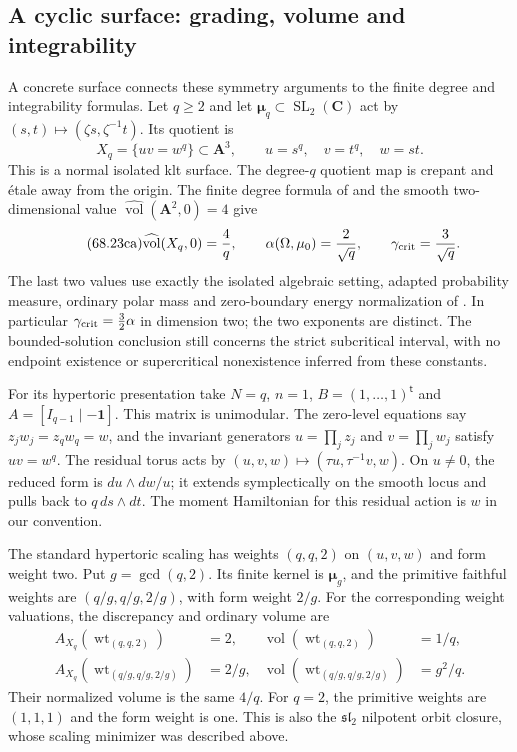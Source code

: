 \subsection{A cyclic surface: grading, volume and integrability}
\label{sec:ytd-local-cyclic-symplectic-example}

A concrete surface connects these symmetry arguments to the finite
degree and integrability formulas. Let $q\geq2$ and let
$\boldsymbol\mu_q\subset\operatorname{SL}_2(\mathbf C)$ act by
$(s,t)\mapsto(\zeta s,\zeta^{-1}t)$. Its quotient is
\[
\tag{68.23bz}\label{eq:ytd-cyclic-surface}
 X_q=\{uv=w^q\}\subset\mathbf A^3,
 \qquad u=s^q,\quad v=t^q,\quad w=st.
\]
This is a normal isolated klt surface. The degree-$q$ quotient map
is crepant and \'etale away from the origin. The finite degree
formula of  and the smooth
two-dimensional value $\widehat{\operatorname{vol}}(\mathbf A^2,0)=4$
give
\[
\tag{68.23ca}\label{eq:ytd-cyclic-volume-thresholds}
 \widehat{\operatorname{vol}}(X_q,0)=\frac4q,
 \qquad \alpha(\Omega,\mu_0)=\frac2{\sqrt q},
 \qquad \gamma_{\rm crit}=\frac3{\sqrt q}.
\]
The last two values use exactly the isolated algebraic setting,
adapted probability measure, ordinary polar mass and zero-boundary
energy normalization of .
In particular $\gamma_{\rm crit}=\frac32\alpha$ in dimension two;
the two exponents are distinct. The bounded-solution conclusion
still concerns the strict subcritical interval, with no endpoint
existence or supercritical nonexistence inferred from these constants.

For its hypertoric presentation take $N=q$, $n=1$,
$B=(1,\ldots,1)^{\mathsf t}$ and
$A=[I_{q-1}\mid-\mathbf 1]$. This matrix is unimodular.
The zero-level equations say $z_jw_j=z_qw_q=w$, and the
invariant generators $u=\prod_j z_j$ and $v=\prod_j w_j$
satisfy $uv=w^q$. The residual torus acts by
$(u,v,w)\mapsto(\tau u,\tau^{-1}v,w)$. On $u\ne0$, the reduced
form is $du\wedge dw/u$; it extends symplectically on the smooth
locus and pulls back to $q\,ds\wedge dt$. The moment Hamiltonian
for this residual action is $w$ in our convention.

The standard hypertoric scaling has weights $(q,q,2)$ on $(u,v,w)$
and form weight two. Put $g=\gcd(q,2)$. Its finite kernel is
$\boldsymbol\mu_g$, and the primitive faithful weights are
$(q/g,q/g,2/g)$, with form weight $2/g$. For the corresponding
weight valuations, the discrepancy and ordinary volume are
\[
\tag{68.23cb}\label{eq:ytd-cyclic-primitive-weights}
 \begin{aligned}
 A_{X_q}(\operatorname{wt}_{(q,q,2)})&=2,&
 \operatorname{vol}(\operatorname{wt}_{(q,q,2)})&=1/q,\\
 A_{X_q}(\operatorname{wt}_{(q/g,q/g,2/g)})&=2/g,&
 \operatorname{vol}(\operatorname{wt}_{(q/g,q/g,2/g)})&=g^2/q.
 \end{aligned}
\]
Their normalized volume is the same $4/q$. For $q=2$, the primitive
weights are $(1,1,1)$ and the form weight is one. This is also the
$\mathfrak{sl}_2$ nilpotent orbit closure, whose scaling minimizer
was described above.

